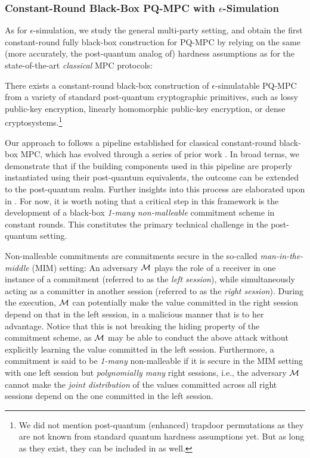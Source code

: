\subsubsection{Constant-Round Black-Box PQ-MPC with $\epsilon$-Simulation}
As for $\epsilon$-simulation, we study the general multi-party setting, and obtain the first constant-round fully black-box construction for PQ-MPC by relying on the same (more accurately, the post-quantum analog of) hardness assumptions as for the state-of-the-art {\em classical} MPC protocols:
\begin{theorem}\label{thm:informal:main}
There exists a constant-round black-box construction of $\epsilon$-simulatable PQ-MPC from a variety of standard post-quantum cryptographic primitives, such as lossy public-key encryption, linearly homomorphic public-key encryption, or dense cryptosystems.\footnote{We did not mention post-quantum (enhanced) trapdoor permutations as they are not known from standard quantum hardness assumptions yet. But as long as they exist, they can be included in  as well.}
\end{theorem}
Our approach to  follows a pipeline established for classical constant-round black-box MPC, which has evolved through a series of prior work \cite{C:IshPraSah08,TCC:PasWee09,FOCS:Wee10,STOC:Goyal11,FOCS:GLOV12}. In broad terms, we demonstrate that if the building components used in this pipeline are properly instantiated using their post-quantum equivalents, the outcome can be extended to the post-quantum realm. Further insights into this process are elaborated upon in . For now, it is worth noting that a critical step in this framework is the development of a black-box {\em 1-many non-malleable} commitment scheme in constant rounds. This constitutes the primary technical challenge in the post-quantum setting.

 Non-malleable commitments \cite{STOC:DolDwoNao91} are commitments secure in the so-called {\em man-in-the-middle} (MIM) setting: An adversary $\mathcal{M}$ plays the role of a receiver in one instance of a commitment (referred to as the {\em left session}), while simultaneously acting as a committer in another session (referred to as the {\em right session}). During the execution, $\mathcal{M}$ can potentially make the value committed in the right session depend on that in the left session, in a malicious manner that is to her advantage. Notice that this is not breaking the hiding property of the commitment scheme, as $\mathcal{M}$ may be able to conduct the above attack without explicitly learning the value committed in the left session. Furthermore, a commitment is said to be {\em 1-many} non-malleable if it is secure in the MIM setting with one left session but {\em polynomially many} right sessions, i.e., the adversary $\mathcal{M}$ cannot make the {\em joint distribution} of the values committed across all right sessions depend on the one committed in the left session.



